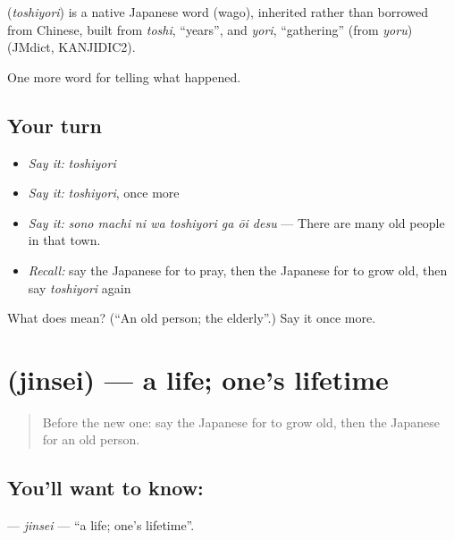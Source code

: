 \begin{cousinweb}
\textbf{} (\emph{toshiyori}) is a native Japanese word (wago), inherited rather than borrowed from Chinese, built from \emph{toshi}, \textquotedblleft{}years\textquotedblright{}, and \emph{yori}, \textquotedblleft{}gathering\textquotedblright{} (from \emph{yoru}) (JMdict, KANJIDIC2).
\end{cousinweb}

\begin{grammarlens}[title={What you've built}]
One more word for telling what happened.
\end{grammarlens}

\subsection*{Your turn}
\begin{itemize}
\raggedright
  \item \emph{Say it:} \emph{toshiyori}
  \item \emph{Say it:} \emph{toshiyori}, once more
  \item \emph{Say it:} \emph{sono machi ni wa toshiyori ga ōi desu} — There are many old people in that town.
  \item \emph{Recall:} say the Japanese for to pray, then the Japanese for to grow old, then say \emph{toshiyori} again
\end{itemize}

\begin{tcolorbox}[breakable,colback=teal!4,colframe=teal!35!black,title={Before you move on}]
What does  mean? (\textquotedblleft{}An old person; the elderly\textquotedblright{}.) Say it once more.
\end{tcolorbox}
\section[\texorpdfstring{\ja{じんせい} (jinsei)}{じんせい (jinsei)}]{ (jinsei) — a life; one's lifetime}

\label{lesson:JA-C292-jinsei}



\begin{quote}
Before the new one: say the Japanese for to grow old, then the Japanese for an old person.
\end{quote}

\subsection*{You'll want to know: }
\textbf{} — \emph{jinsei} — \textquotedblleft{}a life; one's lifetime\textquotedblright{}.


